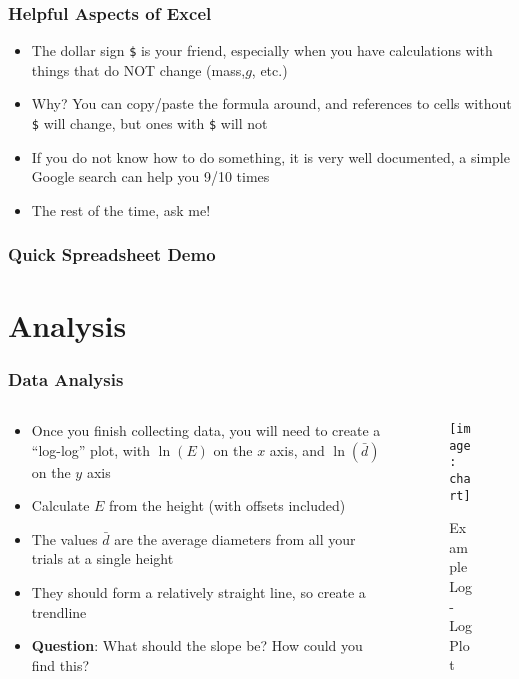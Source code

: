 \documentclass[aspectratio=169]{beamer}
\begin{document}
\begin{frame}
  \frametitle{Helpful Aspects of Excel}
  \begin{itemize}
  \item The dollar sign \texttt{\$} is your friend, especially when you have calculations with things that do NOT change (mass,$g$, etc.)
  \item Why? You can copy/paste the formula around, and references to cells without \texttt{\$} will change, but ones with \texttt{\$} will not
  \item If you do not know how to do something, it is very well documented, a simple Google search can help you 9/10 times
  \item The rest of the time, ask me!
  \end{itemize}
\end{frame}

\begin{frame}
  \frametitle{Quick Spreadsheet Demo}
  
\end{frame}

\section{Analysis}
\begin{frame}
  \frametitle{Data Analysis}
  \begin{columns}
    \begin{column}{0.5\textwidth}
      \begin{itemize}
      \item Once you finish collecting data, you will need to create a ``log-log'' plot, with $\ln(E)$ on the $x$ axis, and $\ln(\bar{d})$ on the $y$ axis
      \item Calculate $E$ from the height (with offsets included)
      \item The values $\bar{d}$ are the average diameters from all your trials at a single height
      \item They should form a relatively straight line, so create a trendline
      \item \textbf{Question}: What should the slope be? How could you find this?
      \end{itemize}
    \end{column}
    \pause
    \begin{column}{0.5\textwidth}
      \begin{figure}[H]
        \centering
        \texttt{[image: chart]}
        \caption{Example Log-Log Plot}
      \end{figure}
    \end{column}
  \end{columns}
\end{frame}
\end{document}
